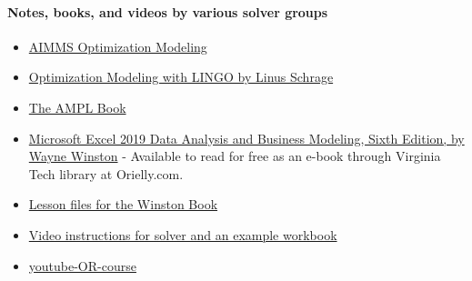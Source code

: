 \paragraph{\textbf{Notes, books, and videos by various solver groups}}
\begin{itemize}
\item \href{https://www.aimms.com/english/developers/resources/manuals/optimization-modeling/}{AIMMS Optimization Modeling}
\item \href{https://www.lindo.com/index.php/ls-downloads?id=112:lingo-documentation&catid=82}{Optimization Modeling with LINGO by Linus Schrage} 
\item \href{https://ampl.com/resources/the-ampl-book/chapter-downloads/}{The AMPL Book}
\item \href{https://learning.oreilly.com/library/view/microsoft-excel-2019/9781509306091/?ar}{Microsoft Excel 2019 Data Analysis and Business Modeling, Sixth Edition, by Wayne Winston} - Available to read for free as an e-book through Virginia Tech library at Orielly.com.
\item \href{https://www.microsoftpressstore.com/store/microsoft-excel-2019-data-analysis-and-business-modeling-9781509305889}{Lesson files for the Winston Book}
\item \href{https://www.xelplus.com/excel-solver-example/}{Video instructions for solver and an example workbook}

\item \href{https://www.youtube.com/playlist?list=PLgA4wLGrqI-ll9OSJmR5nU4lV4_aNTgKx}{youtube-OR-course}
\end{itemize}


